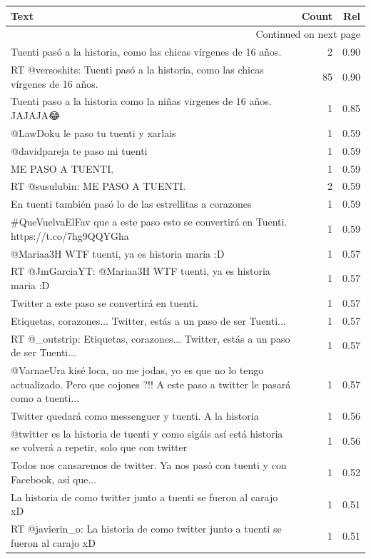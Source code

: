 \begin{longtable}{p{12.5cm}rr}
\toprule
Text & Count & Rel \\
\midrule
\endhead
\midrule
\multicolumn{3}{r}{{Continued on next page}} \\
\midrule
\endfoot

\bottomrule
\endlastfoot
Tuenti pasó a la historia, como las chicas vírgenes de 16 años. & 2 & 0.90 \\
RT @versoshits: Tuenti pasó a la historia, como las chicas vírgenes de 16 años. & 85 & 0.90 \\
Tuenti paso a la historia como la niñas virgenes de 16 años. JAJAJA😂 & 1 & 0.85 \\
@LawDoku le paso tu tuenti y xarlais & 1 & 0.59 \\
@davidpareja te paso mi tuenti & 1 & 0.59 \\
ME PASO A TUENTI. & 1 & 0.59 \\
RT @susulubin: ME PASO A TUENTI. & 2 & 0.59 \\
En tuenti también pasó lo de las estrellitas a corazones & 1 & 0.59 \\
\#QueVuelvaElFav que a este paso esto se convertirá en Tuenti. https://t.co/7hg9QQYGha & 1 & 0.59 \\
@Mariaa3H WTF tuenti, ya es historia maria :D & 1 & 0.57 \\
RT @JmGarciaYT: @Mariaa3H WTF tuenti, ya es historia maria :D & 1 & 0.57 \\
Twitter a este paso se convertirá en tuenti. & 1 & 0.57 \\
Etiquetas, corazones... Twitter, estás a un paso de ser Tuenti... & 1 & 0.57 \\
RT @\_outstrip: Etiquetas, corazones... Twitter, estás a un paso de ser Tuenti... & 1 & 0.57 \\
@VarnaeUra kisé loca, no me jodas, yo es que no lo tengo actualizado. Pero que cojones ?!! A este paso a twitter le pasará como a tuenti... & 1 & 0.57 \\
Twitter quedará como messenguer y tuenti. A la historia & 1 & 0.56 \\
@twitter es la historia de tuenti y como sigáis así está historia se volverá a repetir, solo que con twitter & 1 & 0.56 \\
Todos nos cansaremos de twitter. Ya nos pasó con tuenti y con Facebook, así que... & 1 & 0.52 \\
La historia de como twitter junto a tuenti se fueron al carajo xD & 1 & 0.51 \\
RT @javierin\_o: La historia de como twitter junto a tuenti se fueron al carajo xD & 1 & 0.51 \\

\end{longtable}
\clearpage

